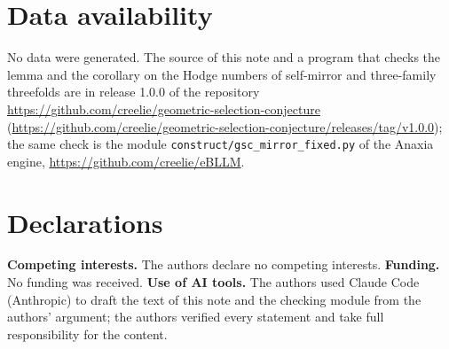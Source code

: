 \documentclass[11pt]{amsart}
\theoremstyle{definition}
\theoremstyle{remark}
\newcommand{\ownrelease}{https://github.com/creelie/geometric-selection-conjecture/releases/tag/v1.0.0}
\begin{document}
\section*{Data availability}

No data were generated. The source of this note and a program that checks the
lemma and the corollary on the Hodge numbers of self-mirror and three-family
threefolds are in release 1.0.0 of the repository
\url{https://github.com/creelie/geometric-selection-conjecture}
(\url{\ownrelease}); the same check is the module
\texttt{construct/gsc\_mirror\_fixed.py} of the Anaxia engine,
\url{https://github.com/creelie/eBLLM}.

\section*{Declarations}

\textbf{Competing interests.} The authors declare no competing interests.
\textbf{Funding.} No funding was received.
\textbf{Use of AI tools.} The authors used Claude Code (Anthropic) to draft
the text of this note and the checking module from the authors' argument;
the authors verified every statement and take full responsibility for the
content.
\end{document}

